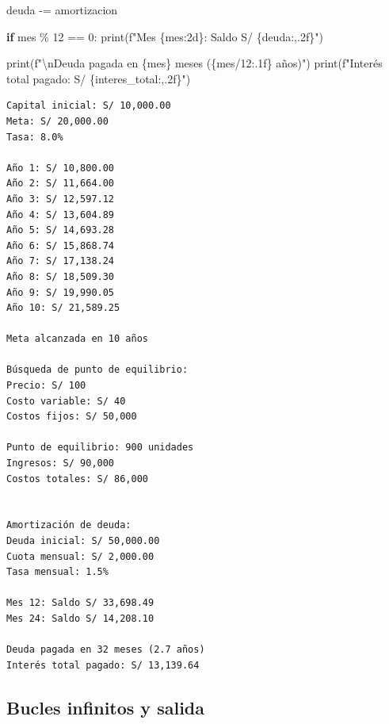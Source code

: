 \documentclass[
  doc,
  floatsintext,
  longtable,
  a4paper,
  nolmodern,
  notxfonts,
  notimes,
  12pt,
  colorlinks=true,linkcolor=blue,citecolor=blue,urlcolor=blue]{apa7}
\newenvironment{Shaded}{\begin{snugshade}}{\end{snugshade}}
\newcommand{\BuiltInTok}[1]{\textcolor[rgb]{0.00,0.23,0.31}{#1}}
\newcommand{\CharTok}[1]{\textcolor[rgb]{0.13,0.47,0.30}{#1}}
\newcommand{\ControlFlowTok}[1]{\textcolor[rgb]{0.00,0.23,0.31}{\textbf{#1}}}
\newcommand{\DecValTok}[1]{\textcolor[rgb]{0.68,0.00,0.00}{#1}}
\newcommand{\NormalTok}[1]{\textcolor[rgb]{0.00,0.23,0.31}{#1}}
\newcommand{\OperatorTok}[1]{\textcolor[rgb]{0.37,0.37,0.37}{#1}}
\newcommand{\SpecialCharTok}[1]{\textcolor[rgb]{0.37,0.37,0.37}{#1}}
\newcommand{\SpecialStringTok}[1]{\textcolor[rgb]{0.13,0.47,0.30}{#1}}
\begin{document}
\begin{Shaded}
\begin{Highlighting}[]
\NormalTok{    deuda }\OperatorTok{{-}=}\NormalTok{ amortizacion}
    
    \ControlFlowTok{if}\NormalTok{ mes }\OperatorTok{\%} \DecValTok{12} \OperatorTok{==} \DecValTok{0}\NormalTok{:}
        \BuiltInTok{print}\NormalTok{(}\SpecialStringTok{f"Mes }\SpecialCharTok{\{}\NormalTok{mes}\SpecialCharTok{:2d\}}\SpecialStringTok{: Saldo S/ }\SpecialCharTok{\{}\NormalTok{deuda}\SpecialCharTok{:,.2f\}}\SpecialStringTok{"}\NormalTok{)}

\BuiltInTok{print}\NormalTok{(}\SpecialStringTok{f"}\CharTok{\textbackslash{}n}\SpecialStringTok{Deuda pagada en }\SpecialCharTok{\{}\NormalTok{mes}\SpecialCharTok{\}}\SpecialStringTok{ meses (}\SpecialCharTok{\{}\NormalTok{mes}\OperatorTok{/}\DecValTok{12}\SpecialCharTok{:.1f\}}\SpecialStringTok{ años)"}\NormalTok{)}
\BuiltInTok{print}\NormalTok{(}\SpecialStringTok{f"Interés total pagado: S/ }\SpecialCharTok{\{}\NormalTok{interes\_total}\SpecialCharTok{:,.2f\}}\SpecialStringTok{"}\NormalTok{)}
\end{Highlighting}
\end{Shaded}

\begin{verbatim}
Capital inicial: S/ 10,000.00
Meta: S/ 20,000.00
Tasa: 8.0%

Año 1: S/ 10,800.00
Año 2: S/ 11,664.00
Año 3: S/ 12,597.12
Año 4: S/ 13,604.89
Año 5: S/ 14,693.28
Año 6: S/ 15,868.74
Año 7: S/ 17,138.24
Año 8: S/ 18,509.30
Año 9: S/ 19,990.05
Año 10: S/ 21,589.25

Meta alcanzada en 10 años

Búsqueda de punto de equilibrio:
Precio: S/ 100
Costo variable: S/ 40
Costos fijos: S/ 50,000

Punto de equilibrio: 900 unidades
Ingresos: S/ 90,000
Costos totales: S/ 86,000


Amortización de deuda:
Deuda inicial: S/ 50,000.00
Cuota mensual: S/ 2,000.00
Tasa mensual: 1.5%

Mes 12: Saldo S/ 33,698.49
Mes 24: Saldo S/ 14,208.10

Deuda pagada en 32 meses (2.7 años)
Interés total pagado: S/ 13,139.64
\end{verbatim}

\subsection{Bucles infinitos y salida}\label{bucles-infinitos-y-salida}
\end{document}
